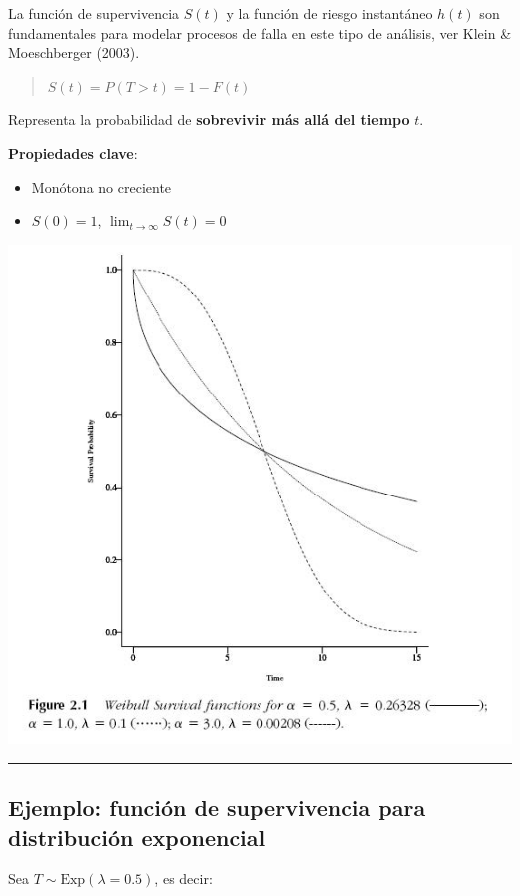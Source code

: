 \documentclass[
  letterpaper,
  DIV=11,
  numbers=noendperiod]{scrartcl}
\providecommand{\tightlist}{%
  \setlength{\itemsep}{0pt}\setlength{\parskip}{0pt}}
\begin{document}
La función de supervivencia \(S(t)\) y la función de riesgo instantáneo
\(h(t)\) son fundamentales para modelar procesos de falla en este tipo
de análisis, ver Klein \& Moeschberger (2003).

\begin{quote}
\(S(t) = P(T > t) = 1 - F(t)\)
\end{quote}

Representa la probabilidad de \textbf{sobrevivir más allá del tiempo}
\(t\).

\textbf{Propiedades clave}:

\begin{itemize}
\tightlist
\item
  Monótona no creciente\\
\item
  \(S(0) = 1\), \(\lim_{t \to \infty} S(t) = 0\)
\end{itemize}

\begin{center}
\includegraphics[width=0.7\linewidth,height=\textheight,keepaspectratio]{figura/Ss.jpg}
\end{center}

\begin{center}\rule{0.5\linewidth}{0.5pt}\end{center}

\subsection{Ejemplo: función de supervivencia para distribución
exponencial}\label{ejemplo-funciuxf3n-de-supervivencia-para-distribuciuxf3n-exponencial}

Sea \(T \sim \text{Exp}(\lambda = 0.5)\), es decir:
\end{document}
